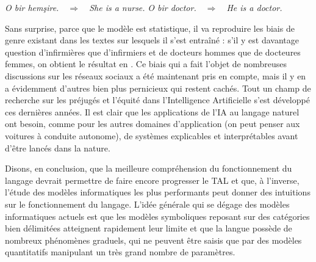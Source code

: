 \ea\label{ex:1.3-traduction}
\ea \textit{O bir hemşire.}\ \ $\Longrightarrow$\ \ \textit{She is a nurse.}
\ex \textit{O bir doctor.}\ \ $\Longrightarrow$\ \ \textit{He is a doctor.}
\z
\z

Sans surprise, parce que le modèle est statistique, il va reproduire les biais de genre existant dans les textes sur lesquels il s’est entraîné : s'il y est davantage question d’infirmières que d’infirmiers et de docteurs hommes que de docteures femmes, on obtient le résultat en . Ce biais qui a fait l’objet de nombreuses discussions sur les réseaux sociaux a été maintenant pris en compte, mais il y en a évidemment d’autres bien plus pernicieux qui restent cachés. Tout un champ de recherche sur les préjugés et l'équité dans l'Intelligence Artificielle s'est développé ces dernières années. Il est clair que les applications de l'IA au langage naturel ont besoin, comme pour les autres domaines d'application (on peut penser aux voitures à conduite autonome), de systèmes explicables et interprétables avant d'être lancés dans la nature. 

Disons, en conclusion, que la meilleure compréhension du fonctionnement du langage devrait permettre de faire encore progresser le TAL et que, à l’inverse, l’étude des modèles informatiques les plus performants peut donner des intuitions sur le fonctionnement du langage. L’idée générale qui se dégage des modèles informatiques actuels est que les modèles symboliques reposant sur des catégories bien délimitées atteignent rapidement leur limite et que la langue possède de nombreux phénomènes graduels, qui ne peuvent être saisis que par des modèles quantitatifs manipulant un très grand nombre de paramètres.

